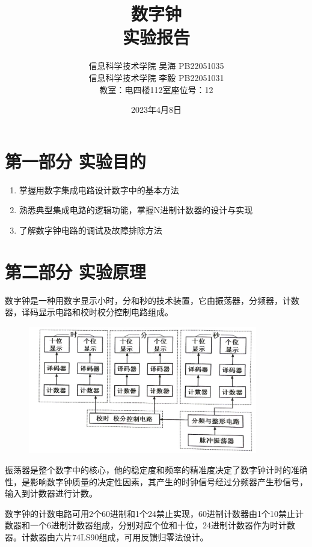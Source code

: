\documentclass{ctexart}
\title{\Large 数字钟\\{\large 实验报告}}
\author{\large  信息科学技术学院 \quad 吴海\MyFont{垚} PB22051035 \\\large  信息科学技术学院 \quad 李\quad 毅 PB22051031 \\{教室：电四楼112室\quad 座位号：12}}
\date{2023年4月8日}
\begin{document}
    \maketitle
    \thispagestyle{empty}
    
    \newpage 
    \setcounter{page}{1}

    \section*{第一部分 \quad 实验目的}
    \begin{enumerate}
        \item 掌握用数字集成电路设计数字中的基本方法
        
        \item 熟悉典型集成电路的逻辑功能，掌握N进制计数器的设计与实现
        
        \item 了解数字钟电路的调试及故障排除方法
    \end{enumerate}

    \section*{第二部分 \quad 实验原理}
    数字钟是一种用数字显示小时，分和秒的技术装置，它由振荡器，分频器，计数器，译码显示电路和校时校分控制电路组成。
    \begin{figure}[htbp]
        \centering
        \includegraphics[width=10cm]{2.1.png}
    \end{figure}

    振荡器是整个数字中的核心，他的稳定度和频率的精准度决定了数字钟计时的准确性，是影响数字钟质量的决定性因素，其产生的时钟信号经过分频器产生秒信号，输入到计数器进行计数。

    数字钟的计数电路可用2个60进制和1个24禁止实现，60进制计数器由1个10禁止计数器和一个6进制计数器组成，分别对应个位和十位，24进制计数器作为时计数器。计数器由六片74LS90组成，可用反馈归零法设计。
\end{document}
